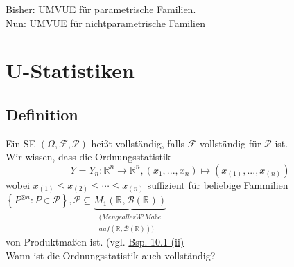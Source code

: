 \documentclass[german,10pt,oneside, fleqn, a4paper]{article}
\newcommand {\R}	{\mathbb{R}}
\newcommand{\ra}{\rightarrow}
\newcommand{\brc}[1]{\left(#1\right)}
\newcommand{\brac}[1]{\left\lbrace #1\right\rbrace}
\newcommand{\mc}[1]{\mathcal{#1}}
\newcommand{\1}[1]{1_{#1}}
\newcommand{\2}[1]{\1{\brac{#1}}}
\newcommand{\rbor}[1][d]{\brc{\R^{#1},\mc{B}\brc{\R^{#1}}}}
\newcommand{\rraum}{\brc{\Omega,\mc{F},\mc{P}}}
\newcommand{\f}{\mc{F}}
\newcommand{\p}{\mc{P}}
\newcommand{\stuff}{{\otimes n}}
\begin{document}
\pagebreak
Bisher: UMVUE für parametrische Familien. \\
Nun: UMVUE für nichtparametrische Familien
\section{U-Statistiken}
\subsection{Definition}
\label{12.1}
Ein SE $\rraum$ heißt vollständig, falls $\f$ vollständig für $\p$ ist.\\
Wir wissen, dass die Ordnungsstatistik\[
Y=Y_n:\R^n\ra\R^n, (x_1,...,x_n)\mapsto(x_{(1)},...,x_{(n)})\] wobei $x_{(1)}\leq x_{(2)}\leq \cdots\leq x_{(n)}$ suffizient für beliebige Fammilien $\brac{P^\stuff:P\in\p},\p\subseteq \underbrace{M_1\rbor[]}_{\substack{(Menge aller W'Maße\\auf\rbor[])}}$\\
von Produktmaßen ist. (vgl. \hyperref[10.1]{Bsp. 10.1 (ii)}\\
Wann ist die Ordnungsstatistik auch vollständig?
\end{document}
